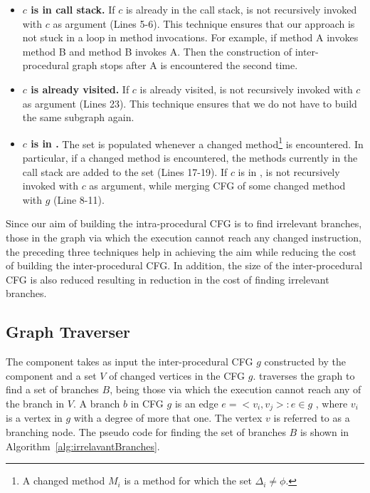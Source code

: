 \begin{itemize}
	\item \textbf{$c$ is in call stack.} If $c$ is already in the call stack,  is not recursively invoked with $c$ as argument (Lines 5-6). This technique ensures that our approach is not stuck in a loop in method invocations. For example, if method A invokes method B and method B invokes A. Then the construction of inter-procedural graph stops after A is encountered the second time.
	\item \textbf{ $c$ is already visited.} If $c$ is already visited,  is not recursively invoked with $c$ as argument (Lines 23). This technique ensures that we do not have to build the same subgraph again.
	\item \textbf{ $c$ is in .} The set  is populated whenever a changed method\footnote{A changed method $M_i$ is a method for which the set $\Delta_i \neq \phi $.} is encountered. In particular, if a changed method is encountered, the methods currently in the call stack are added to the set   (Lines 17-19). If $c$ is in ,  is not recursively invoked with $c$ as argument, while merging CFG of some changed method with $g$ (Line 8-11).
\end{itemize}
Since our aim of building the intra-procedural CFG is to find irrelevant branches, those in the graph via which the execution cannot reach any changed instruction, the preceding three techniques help in achieving the aim while reducing the cost of building the inter-procedural CFG. In addition, the size of the inter-procedural CFG is also reduced resulting in reduction in the cost of finding irrelevant branches.

\subsection{Graph Traverser}
The  component takes as input the inter-procedural CFG $g$ constructed by the  component and a set $V$ of changed vertices in the CFG $g$.  traverses the graph to find a set of branches $B$, being those via which the execution cannot reach any of the branch in $V$. A branch $b$ in CFG $g$ is an edge $e = <v_i, v_j>: e \in g$ , where $v_i$ is a vertex in $g$ with a degree of more that one. The vertex $v$ is referred to as a branching node. The pseudo code for finding the set of branches $B$ is shown in Algorithm~\ref{alg:irrelavantBranches}.

